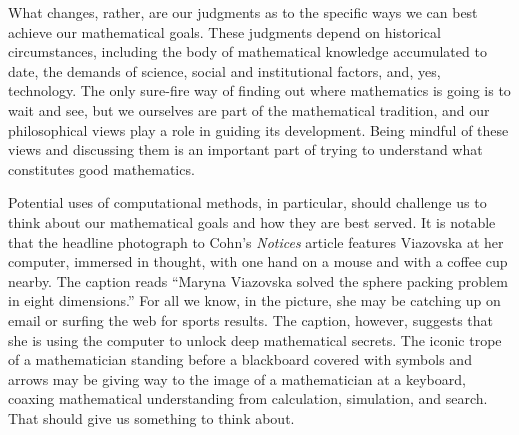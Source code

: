 \documentclass[12pt]{amsart}
\theoremstyle{definition}
\theoremstyle{remark}
\numberwithin{equation}{section}
\begin{document}
What changes, rather, are our judgments as to the specific ways we can best achieve our mathematical goals. These judgments depend on historical circumstances, including the body of mathematical knowledge accumulated to date, the demands of science, social and institutional factors, and, yes, technology. The only sure-fire way of finding out where mathematics is going is to wait and see, but we ourselves are part of the mathematical tradition, and our philosophical views play a role in guiding its development. Being mindful of these views and discussing them is an important part of trying to understand what constitutes good mathematics.

Potential uses of computational methods, in particular, should challenge us to think about our mathematical goals and how they are best served. It is notable that the headline photograph to Cohn's \emph{Notices} article features Viazovska at her computer, immersed in thought, with one hand on a mouse and with a coffee cup nearby. The caption reads ``Maryna Viazovska solved the sphere packing problem in eight dimensions.'' For all we know, in the picture, she may be catching up on email or surfing the web for sports results. The caption, however, suggests that she is using the computer to unlock deep mathematical secrets. The iconic trope of a mathematician standing before a blackboard covered with symbols and arrows may be giving way to the image of a mathematician at a keyboard, coaxing mathematical understanding from calculation, simulation, and search. That should give us something to think about.



\end{document}
